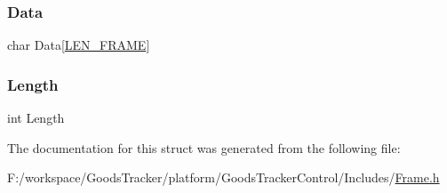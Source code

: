 \mbox{\label{struct_frame_a395667fd57a36b9d4744e91cc7f471cb}} 
\subsubsection{\texorpdfstring{Data}{Data}}
{\footnotesize\ttfamily char Data\mbox{[}\hyperlink{_frame_8h_a3709c155f7aad2c88988bf0e2487f5ec}{L\+E\+N\+\_\+\+F\+R\+A\+ME}\mbox{]}}

\mbox{\label{struct_frame_a9fde862c8bc443d7a6872a487ec265a3}} 
\subsubsection{\texorpdfstring{Length}{Length}}
{\footnotesize\ttfamily int Length}



The documentation for this struct was generated from the following file\+:\begin{DoxyCompactItemize}
\item 
F\+:/workspace/\+Goods\+Tracker/platform/\+Goods\+Tracker\+Control/\+Includes/\hyperlink{_frame_8h}{Frame.\+h}\end{DoxyCompactItemize}
